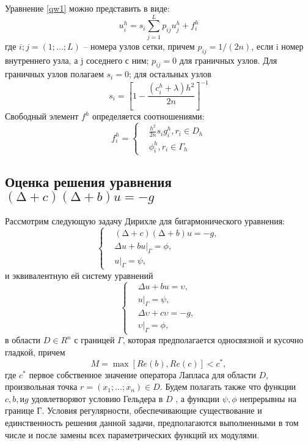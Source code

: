 Уравнение \ref{qw1} можно представить в виде:
\begin{equation}
u^{h}_{i}=s_{i}\sum^{L}_{j=1}{p_{ij}u^{h}_{j}+f^{h}_{i}}
	\label{qw2}
\end{equation} 
где $i; j = (1; \dots; L)$ --  номера узлов сетки, причем $p_{ij} = 1/(2n)$, если i 
номер внутреннего узла, а j  соседнего с ним; $p_{ij} = 0$ для граничных
узлов. Для граничных узлов полагаем $s_{i} = 0$; для остальных узлов
\begin{equation}
s_{i}= 
	\left[
1-\frac{(c^{h}_{i}+\lambda)h^{2}}{2n}
 \right]^{-1} 
	\label{qw3}
\end{equation}
Свободный элемент $f^{h}$ определяется соотношениями:
\begin{equation} f^{h}_{i}= 
	\left\{
\begin{aligned}
& \frac{h^{2}}{2n}s_{i}g^{h}_{i}, r_{i} \in D_{h}\\ & \phi^{h}_{i}, r_{i} \in \Gamma_{h}
\end{aligned}
 \right. \label{qw4}\end{equation}
\subsection{Оценка решения уравнения $(∆ + c)(∆ + b)u = -g$}
Рассмотрим следующую задачу Дирихле для бигармонического уравнения: 
\begin{equation} 
	\left\{
\begin{aligned}
& (∆ + c)(∆ + b)u = -g,\\ & \Delta u + bu|_{\Gamma} = \phi, \\ & u|_{\Gamma} = \psi, 
\end{aligned}
 \right. \label{qw5}\end{equation}
и эквивалентную ей систему уравнений
\begin{equation} 
	\left\{
\begin{aligned}
&\Delta u + bu =\upsilon, \\ & u|_{\Gamma} = \psi, \\  &\Delta \upsilon + c\upsilon =-g,
\\  & \upsilon|_{\Gamma} = \phi, 
\end{aligned}
 \right. \label{qw6}
\end{equation}
в области $D\in R^{n}$ с границей $\Gamma$, которая предполагается односвязной и
кусочно гладкой, причем 
\begin{equation}
	M=\max{[Re(b),Re(c)]} < c^{*},
\end{equation}
где $c^{*}$ первое собственное значение оператора Лапласа для области $D$, произвольная точка $ r = (x_{1}; \dots; x_{n}) \in D$. Будем полагать также что функции $c, b, и g $ удовлетворяют условию Гельдера в $D$ , а функции $ \psi, \phi$ непрерывны на границе Г. Условия регулярности, обеспечивающие существование и единственность решения данной задачи, предполагаются выполненными в том числе и после замены всех параметрических функций их модулями.


